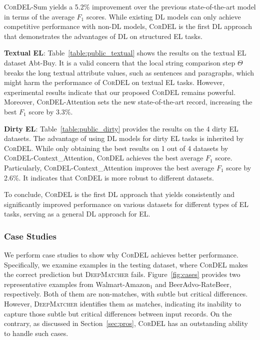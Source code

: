 \documentclass[conference]{IEEEtran}
\begin{document}
\textsc{CorDEL}-Sum yields a 5.2$\%$ improvement over the previous state-of-the-art model in terms of the average $F_1$ scores. While existing DL models can only achieve competitive performance with non-DL models, \textsc{CorDEL} is the first DL approach that demonstrates the advantages of DL on structured EL tasks.
    
\textbf{Textual EL}: Table~\ref{table:public_textual} shows the results on the textual EL dataset Abt-Buy. It is a valid concern that the local string comparison step $\Theta$ breaks the long textual attribute values, such as sentences and paragraphs, which might harm the performance of \textsc{CorDEL} on textual EL tasks. However, experimental results indicate that our proposed \textsc{CorDEL} remains powerful. Moreover, \textsc{CorDEL}-Attention sets the new state-of-the-art record, increasing the best $F_1$ score by 3.3$\%$.
    
\textbf{Dirty EL}: Table~\ref{table:public_dirty} provides the results on the 4 dirty EL datasets. The advantage of using DL models for dirty EL tasks is inherited by \textsc{CorDEL}. While only obtaining the best results on 1 out of 4 datasets by \textsc{CorDEL}-Context\_Attention, \textsc{CorDEL} achieves the best average $F_1$ score. Particularly, \textsc{CorDEL}-Context\_Attention improves the best average $F_1$ score by 2.6$\%$. It indicates that \textsc{CorDEL} is more robust to different datasets.

To conclude, \textsc{CorDEL} is the first DL approach that yields consistently and significantly improved performance on various datasets for different types of EL tasks, serving as a general DL approach for EL.


\subsubsection{Case Studies}\label{sec:case_study}

We perform case studies to show why \textsc{CorDEL} achieves better performance. Specifically, we examine examples in the testing dataset, where \textsc{CorDEL} makes the correct prediction but \textsc{DeepMatcher} fails. Figure~\ref{fig:cases} provides two representative examples from Walmart-Amazon$_1$ and BeerAdvo-RateBeer, respectively. Both of them are non-matches, with subtle but critical differences. However, \textsc{DeepMatcher} identifies them as matches, indicating its inability to capture those subtle but critical differences between input records. On the contrary, as discussed in Section~\ref{sec:pros}, \textsc{CorDEL} has an outstanding ability to handle such cases.
\end{document}
